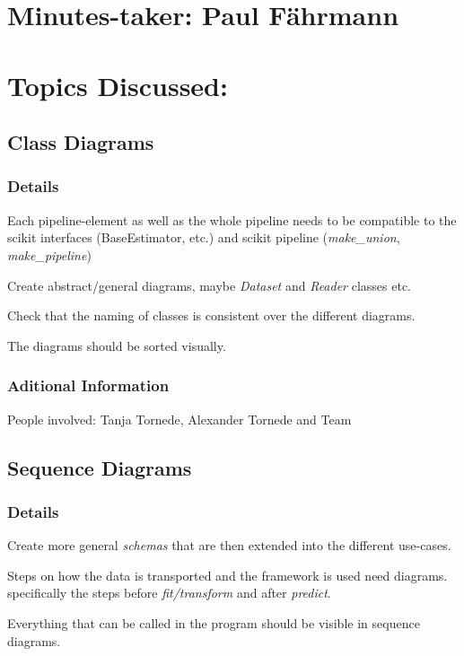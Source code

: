 \documentclass[11pt]{meetingmins} %
\begin{document}
\maketitle

\section{Minutes-taker: Paul Fährmann}

\section{Topics Discussed:}

\subsection{Class Diagrams}
    \subsubsection{Details}
        \begin{hiddensubitems}
            \item Each pipeline-element as well as the whole pipeline needs to be compatible to the scikit  interfaces (BaseEstimator, etc.) and scikit pipeline (\textit{make\_union}, \textit{make\_pipeline})
            \item Create abstract/general diagrams, maybe \textit{Dataset} and \textit{Reader} classes etc.
            \item Check that the naming of classes is consistent over the different diagrams.
            \item The diagrams should be sorted visually.
        \end{hiddensubitems}
	\subsubsection{Aditional Information}
		\begin{hiddensubitems}
			\item People involved: Tanja Tornede, Alexander Tornede and Team
		\end{hiddensubitems}

\subsection{Sequence Diagrams}
	\subsubsection{Details}
		\begin{hiddensubitems}
			\item Create more general \textit{schemas} that are then extended into the different use-cases.
			\item Steps on how the data is transported and the framework is used need diagrams. specifically the steps before \textit{fit/transform} and after \textit{predict}.
			\item Everything that can be called in the program should be visible in sequence diagrams.
		\end{hiddensubitems}
\end{document}
